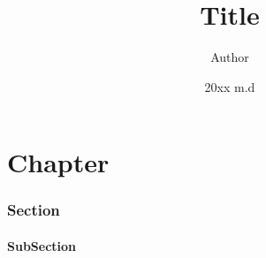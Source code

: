 \documentclass[11pt, oneside]{article}  %
\title{Title}
\author{Author}
\date{20xx m.d}
\begin{document}
\maketitle\newpage

\part*{Chapter }
\section*{Section}
\subsection{SubSection}
\end{document}

